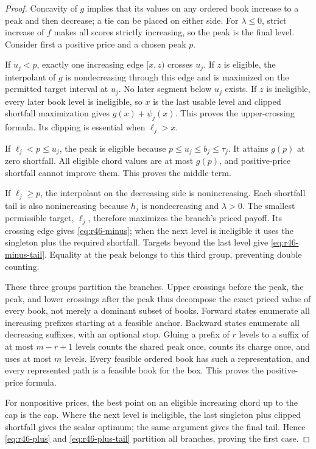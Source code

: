 \begin{proof}
Concavity of $g$ implies that its values on any ordered book increase to a peak and then decrease; a tie can be placed on either side. For $\lambda\leq0$, strict increase of $f$ makes all scores strictly increasing, so the peak is the final level. Consider first a positive price and a chosen peak $p$.

If $u_j<p$, exactly one increasing edge $[x,z)$ crosses $u_j$. If $z$ is eligible, the interpolant of $g$ is nondecreasing through this edge and is maximized on the permitted target interval at $u_j$. No later segment below $u_j$ exists. If $z$ is ineligible, every later book level is ineligible, so $x$ is the last usable level and clipped shortfall maximization gives $g(x)+\psi_j(x)$. This proves the upper-crossing formula. Its clipping is essential when $\ell_j>x$.

If $\ell_j<p\leq u_j$, the peak is eligible because $p\leq u_j\leq b_j\leq\tau_j$. It attains $g(p)$ at zero shortfall. All eligible chord values are at most $g(p)$, and positive-price shortfall cannot improve them. This proves the middle term.

If $\ell_j\geq p$, the interpolant on the decreasing side is nonincreasing. Each shortfall tail is also nonincreasing because $h_j$ is nondecreasing and $\lambda>0$. The smallest permissible target, $\ell_j$, therefore maximizes the branch's priced payoff. Its crossing edge gives \eqref{eq:r46-minus}; when the next level is ineligible it uses the singleton plus the required shortfall. Targets beyond the last level give \eqref{eq:r46-minus-tail}. Equality at the peak belongs to this third group, preventing double counting.

These three groups partition the branches. Upper crossings before the peak, the peak, and lower crossings after the peak thus decompose the exact priced value of every book, not merely a dominant subset of books. Forward states enumerate all increasing prefixes starting at a feasible anchor. Backward states enumerate all decreasing suffixes, with an optional stop. Gluing a prefix of $r$ levels to a suffix of at most $m-r+1$ levels counts the shared peak once, counts its charge once, and uses at most $m$ levels. Every feasible ordered book has such a representation, and every represented path is a feasible book for the box. This proves the positive-price formula.

For nonpositive prices, the best point on an eligible increasing chord up to the cap is the cap. Where the next level is ineligible, the last singleton plus clipped shortfall gives the scalar optimum; the same argument gives the final tail. Hence \eqref{eq:r46-plus} and \eqref{eq:r46-plus-tail} partition all branches, proving the first case.


\end{proof}
